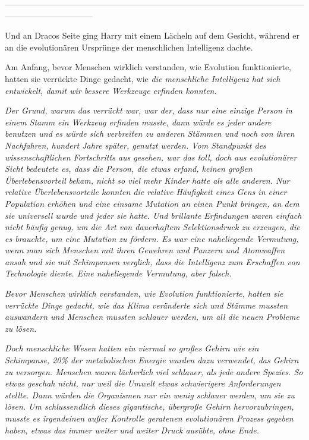 {--------------------------------------------------------------------------------------------------------------------------------------------

Und an Dracos Seite ging Harry mit einem Lächeln auf dem Gesicht, während er an die evolutionären Ursprünge der menschlichen Intelligenz dachte.

Am Anfang, bevor Menschen wirklich verstanden, wie Evolution funktionierte, hatten sie verrückte Dinge gedacht, wie \emph{die menschliche Intelligenz hat sich entwickelt, damit wir bessere Werkzeuge erfinden konnten.}

\emph{Der Grund, warum das verrückt war, war der, dass nur eine einzige Person in einem Stamm ein Werkzeug erfinden musste, dann würde es jeder andere benutzen und es würde sich verbreiten zu anderen Stämmen und noch von ihren Nachfahren, hundert Jahre später, genutzt werden. Vom Standpunkt des wissenschaftlichen Fortschritts aus gesehen, war das toll, doch aus evolutionärer Sicht bedeutete es, dass die Person, die etwas erfand, keinen großen Überlebens\emph{vorteil}} \emph{bekam, nicht so viel} \emph{\emph{mehr}} \emph{Kinder hatte als alle anderen. Nur} \emph{\emph{relative}} \emph{Überlebensvorteile konnten die relative Häufigkeit eines Gens in einer Population erhöhen und eine einsame Mutation an einen Punkt bringen, an dem sie universell wurde und jeder sie hatte. Und brillante Erfindungen waren einfach nicht häufig genug, um die Art von dauerhaftem Selektionsdruck zu erzeugen, die es brauchte, um eine Mutation zu fördern. Es war eine naheliegende Vermutung, wenn man sich Menschen mit ihren Gewehren und Panzern und Atomwaffen ansah und sie mit Schimpansen verglich, dass die Intelligenz zum Erschaffen von Technologie diente. Eine naheliegende Vermutung, aber falsch.}

\emph{Bevor Menschen wirklich verstanden, wie Evolution funktionierte, hatten sie verrückte Dinge gedacht, wie} \emph{\emph{das Klima veränderte sich und Stämme mussten auswandern und Menschen mussten schlauer werden, um all die neuen Probleme zu lösen.}}

\emph{Doch menschliche Wesen hatten ein viermal so großes Gehirn wie ein Schimpanse, 20\% der metabolischen Energie wurden dazu verwendet, das Gehirn zu versorgen. Menschen waren} \emph{\emph{lächerlich}} \emph{viel schlauer, als jede} \emph{andere Spezies. So etwas} \emph{geschah} \emph{nicht, nur weil die Umwelt etwas schwierigere Anforderungen stellte. Dann würden die Organismen nur ein wenig schlauer} \emph{werden, um sie zu lösen. Um schlussendlich dieses gigantische, übergroße Gehirn hervorzubringen, musste es irgendeinen} \emph{\emph{außer Kontrolle geratenen}} \emph{evolutionären Prozess gegeben haben, etwas das immer weiter} \emph{und weiter} \emph{Druck ausübte, ohne Ende.}

}
